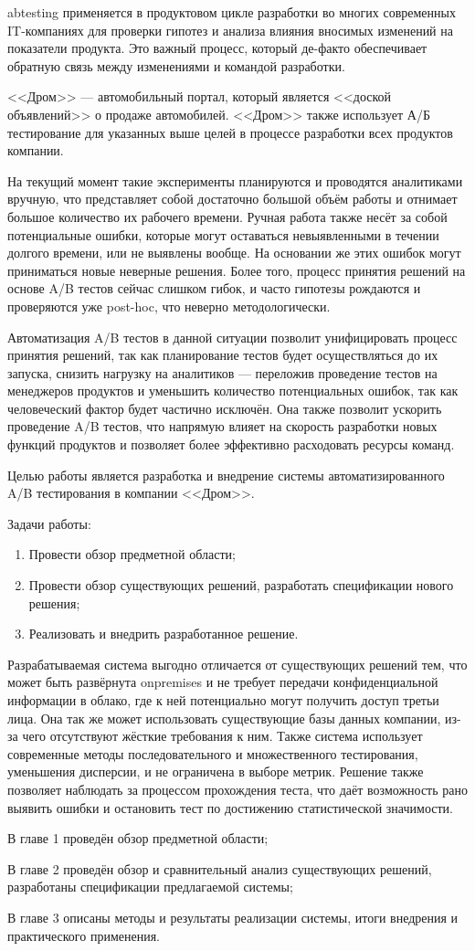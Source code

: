 \documentclass[../document.tex]{subfiles}
\begin{document}
	\par\gls{abtesting} применяется в продуктовом цикле разработки во многих современных IT-компаниях для проверки гипотез и анализа влияния вносимых изменений на показатели продукта. Это важный процесс, который де-факто обеспечивает обратную связь между изменениями и командой разработки.
	\par <<Дром>> --- автомобильный портал, который является <<доской объявлений>> о продаже автомобилей. <<Дром>> также использует А/Б тестирование для указанных выше целей в процессе разработки всех продуктов компании.
	\par На текущий момент такие эксперименты планируются и проводятся аналитиками вручную, что представляет собой достаточно большой объём работы и отнимает большое количество их рабочего времени. Ручная работа также несёт за собой потенциальные ошибки, которые могут оставаться невыявленными в течении долгого времени, или не выявлены вообще. На основании же этих ошибок могут приниматься новые неверные решения. Более того, процесс принятия решений на основе A/B тестов сейчас слишком гибок, и часто гипотезы рождаются и проверяются уже post-hoc, что неверно методологически.
	\par Автоматизация A/B тестов в данной ситуации позволит унифицировать процесс принятия решений, так как планирование тестов будет осуществляться до их запуска, снизить нагрузку на аналитиков --- переложив проведение тестов на менеджеров продуктов и уменьшить количество потенциальных ошибок, так как человеческий фактор будет частично исключён. Она также позволит ускорить проведение A/B тестов, что напрямую влияет на скорость разработки новых функций продуктов и позволяет более эффективно расходовать ресурсы команд.
	\par Целью работы является разработка и внедрение системы автоматизированного A/B тестирования в компании <<Дром>>.
	\par Задачи работы:
	\begin{enumerate}
		\item Провести обзор предметной области;
		\item Провести обзор существующих решений, разработать спецификации нового решения;
		\item Реализовать и внедрить разработанное решение.
	\end{enumerate}
	\par Разрабатываемая система выгодно отличается от существующих решений тем, что может быть развёрнута \gls{onpremises} и не требует передачи конфиденциальной информации в облако, где к ней потенциально могут получить доступ третьи лица. Она так же может использовать существующие базы данных компании, из-за чего отсутствуют жёсткие требования к ним. Также система использует современные методы последовательного и множественного тестирования, уменьшения дисперсии, и не ограничена в выборе метрик. Решение также позволяет наблюдать за процессом прохождения теста, что даёт возможность рано выявить ошибки и остановить тест по достижению статистической значимости.
	\par В главе 1 проведён обзор предметной области;
	\par В главе 2 проведён обзор и сравнительный анализ существующих решений, разработаны спецификации предлагаемой системы;
	\par В главе 3 описаны методы и результаты реализации системы, итоги внедрения и практического применения.
\end{document}
